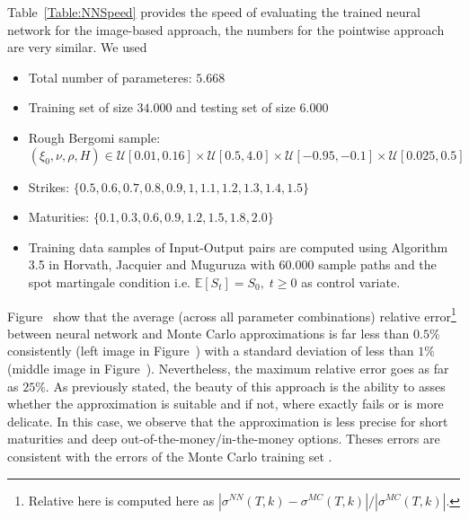\documentclass{article}
\theoremstyle{remark}
\begin{document}
Table~\ref{Table:NNSpeed} provides the speed of evaluating the trained neural
network for the image-based approach, the numbers for the pointwise approach
are very similar. We used
\begin{itemize}
\item Total number of parameteres: $5.668$
\item Training set of size $34.000$ and testing set of size $6.000$
\item Rough Bergomi sample: $(\xi_0,\nu,\rho,H)\in
  \mathcal{U}[0.01,0.16]\times \mathcal{U}[0.5,4.0]\times
  \mathcal{U}[-0.95,-0.1]\times \mathcal{U}[0.025,0.5]$ 
\item Strikes: $\{0.5,0.6,0.7,0.8,0.9,1,1.1,1.2,1.3,1.4,1.5\}$
\item Maturities: $\{0.1,0.3,0.6,0.9,1.2,1.5,1.8,2.0 \}$
\item Training data samples of Input-Output pairs are computed using Algorithm
  3.5 in Horvath, Jacquier and Muguruza \cite{HJM17} with $60.000$ sample
  paths and the spot martingale condition i.e. $\mathbb{E}[S_t]=S_0,\;t\geq 0$
  as control variate. 
\end{itemize}



Figure~ show that the average (across all parameter
combinations) relative error\footnote{Relative here is computed here as
  $|\sigma^{NN}(T,k)-\sigma^{MC}(T,k)|/|\sigma^{MC}(T,k)|$.} between neural
network and Monte Carlo approximations is far less than $0.5\%$ consistently
(left image in Figure~) with a standard deviation of less
than $1\%$ (middle image in Figure~). Nevertheless, the
maximum relative error goes as far as $25\%$. As previously stated, the beauty
of this approach is the ability to asses whether the approximation is suitable
and if not, where exactly fails or is more delicate. In this case, we observe
that the approximation is less precise for short maturities and deep
out-of-the-money/in-the-money options. Theses errors are consistent with the
errors of the Monte Carlo training set %
. 
\end{document}
